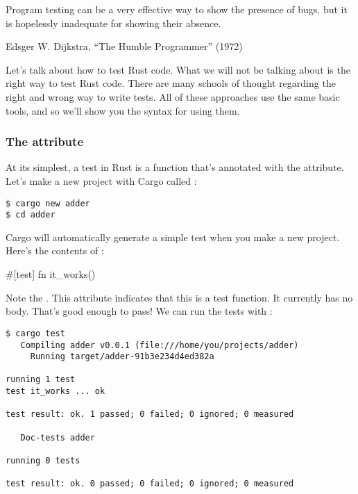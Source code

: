 
\begin{myquote}
Program testing can be a very effective way to show the presence of bugs, but it is hopelessly inadequate for showing their absence.

\blank

Edsger W. Dijkstra, \enquote{The Humble Programmer} (1972)
\end{myquote}

Let's talk about how to test Rust code. What we will not be talking about is the right way to test Rust code. There are many schools 
of thought regarding the right and wrong way to write tests. All of these approaches use the same basic tools, and so we'll show you 
the syntax for using them.

\subsubsection*{The  attribute}

At its simplest, a test in Rust is a function that's annotated with the  attribute. Let's make a new project with Cargo 
called :

\begin{verbatim}
$ cargo new adder
$ cd adder
\end{verbatim}

Cargo will automatically generate a simple test when you make a new project. Here's the contents of :

\begin{rustc}
#[test]
fn it_works() {
}
\end{rustc}

Note the \code{\#[test]}. This attribute indicates that this is a test function. It currently has no body. That's good enough to pass! 
We can run the tests with :

\begin{verbatim}
$ cargo test
   Compiling adder v0.0.1 (file:///home/you/projects/adder)
     Running target/adder-91b3e234d4ed382a

running 1 test
test it_works ... ok

test result: ok. 1 passed; 0 failed; 0 ignored; 0 measured

   Doc-tests adder

running 0 tests

test result: ok. 0 passed; 0 failed; 0 ignored; 0 measured
\end{verbatim}

